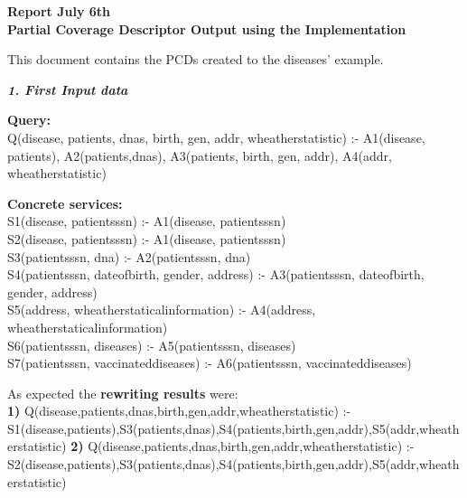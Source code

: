 \documentclass[12pt,a4paper,oneside]{report}
\begin{document}
\begin{center}
\textbf{\large{Report July 6th}} \\
\textbf{\large{Partial Coverage Descriptor Output using the Implementation}}
\end{center}

This document contains the PCDs created to the diseases' example. 

\bigskip

\begin{flushleft}
\textsl{\textbf{ 1. First Input data}}
\end{flushleft}

\begin{flushleft}
\textbf{Query:} \\
Q(disease, patients, dnas, birth, gen, addr, wheatherstatistic) :- A1(disease, patients), A2(patients,dnas), A3(patients, birth, gen, addr), A4(addr, wheatherstatistic) \\
\end{flushleft}

\begin{flushleft}
\textbf{Concrete services:} \\
S1(disease, patientsssn) :- A1(disease, patientsssn)\\
S2(disease, patientsssn) :- A1(disease, patientsssn)\\
S3(patientsssn, dna) :- A2(patientsssn, dna)\\
S4(patientsssn, dateofbirth, gender, address) :- A3(patientsssn, dateofbirth, gender, address)\\
S5(address, wheatherstaticalinformation) :- A4(address, wheatherstaticalinformation)\\
S6(patientsssn, diseases) :- A5(patientsssn, diseases)\\
S7(patientsssn, vaccinateddiseases) :- A6(patientsssn, vaccinateddiseases)\\
\end{flushleft}

\begin{flushleft}
As expected the \textbf{rewriting results} were: \\
\textbf{1)} Q(disease,patients,dnas,birth,gen,addr,wheatherstatistic) :- S1(disease,patients),S3(patients,dnas),S4(patients,birth,gen,addr),S5(addr,wheatherstatistic)
\textbf{2)} Q(disease,patients,dnas,birth,gen,addr,wheatherstatistic) :- S2(disease,patients),S3(patients,dnas),S4(patients,birth,gen,addr),S5(addr,wheatherstatistic)
\end{flushleft}
\end{document}

